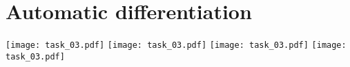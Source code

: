  \section{Automatic differentiation}
 \begin{center}
\texttt{[image: task\_03.pdf]}    \newpage
 \texttt{[image: task\_03.pdf]}    
 \texttt{[image: task\_03.pdf]}    
 \newpage
 \texttt{[image: task\_03.pdf]}    
 \end{center}
 
